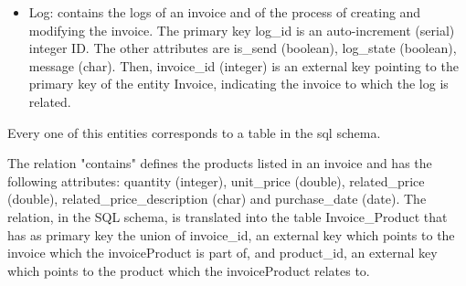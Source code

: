 \begin{itemize}
	\item Log: contains the logs of an invoice and of the process of creating and modifying the invoice. The primary key log\_id is an auto-increment (serial) integer ID. The other attributes are is\_send (boolean), log\_state (boolean), message (char). Then, invoice\_id (integer) is an external key pointing to the primary key of the entity Invoice, indicating the invoice to which the log is related.
\end{itemize}
Every one of this entities corresponds to a table in the sql schema.

The relation "contains" defines the products listed in an invoice and has the following attributes: quantity (integer), unit\_price (double), related\_price (double), related\_price\_description (char) and purchase\_date (date). The relation, in the SQL schema, is translated into the table Invoice\_Product that has as primary key the union of invoice\_id, an external key which points to the invoice which the invoiceProduct is part of, and product\_id, an external key which points to the product which the invoiceProduct relates to.


